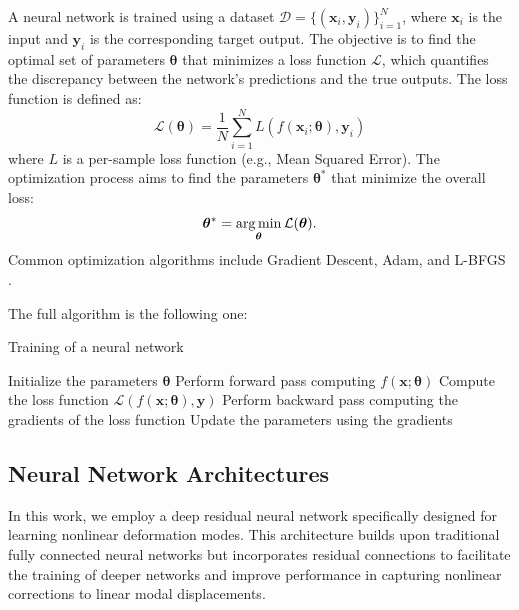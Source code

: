 A neural network is trained using a dataset \( \mathcal{D} = \{(\bm{x}_i, \bm{y}_i)\}_{i=1}^N \), where \( \bm{x}_i \) is the input and \( \bm{y}_i \) is the corresponding target output. The objective is to find the optimal set of parameters \( \bm{\theta} \) that minimizes a loss function \( \mathcal{L} \), which quantifies the discrepancy between the network's predictions and the true outputs. The loss function is defined as:
\begin{equation}
    \mathcal{L}(\bm{\theta}) = \frac{1}{N} \sum_{i=1}^N L(f(\bm{x}_i; \bm{\theta}), \bm{y}_i)
\end{equation}
where \( L \) is a per-sample loss function (e.g., Mean Squared Error). The optimization process aims to find the parameters \( \bm{\theta}^* \) that minimize the overall loss:
\begin{equation}
    \bm{\theta}^* = \operatorname*{arg\,min}_{\bm{\theta}} \mathcal{L}(\bm{\theta}).
\end{equation}
Common optimization algorithms include Gradient Descent, Adam, and L-BFGS \cite{Liu_1989}.

The full algorithm is the following one:
\begin{algorithm} 
    \caption{Training of a neural network}
    \begin{algorithmic}
        \State Initialize the parameters \( \bm{\theta} \)
                \State Perform forward pass computing \( f(\bm{x}; \bm{\theta}) \)
                \State Compute the loss function \( \mathcal{L}(f(\bm{x}; \bm{\theta}), \bm{y}) \)
                \State Perform backward pass computing the gradients of the loss function
                \State Update the parameters using the gradients
            \EndFor
        \EndWhile
    \end{algorithmic}
\end{algorithm}



\subsection{Neural Network Architectures}
In this work, we employ a deep residual neural network specifically designed for learning nonlinear deformation modes. This architecture builds upon traditional fully connected neural networks but incorporates residual connections to facilitate the training of deeper networks and improve performance in capturing nonlinear corrections to linear modal displacements.



